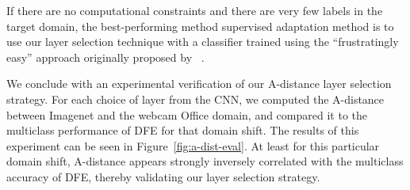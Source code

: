 If there are no computational constraints and there are very few labels in
the target domain, the best-performing method supervised adaptation method is to use our layer selection technique with a classifier trained using the ``frustratingly easy'' approach originally proposed by \daume~\cite{daume}.

We conclude with an experimental verification of our A-distance layer selection strategy.
For each choice of layer from the CNN, we computed the A-distance between Imagenet and the webcam Office domain, and compared it to the multiclass performance of DFE for that domain shift.
The results of this experiment can be seen in Figure~\ref{fig:a-dist-eval}.
At least for this particular domain shift, A-distance appears strongly inversely correlated with the multiclass accuracy of DFE, thereby validating our layer selection strategy.
